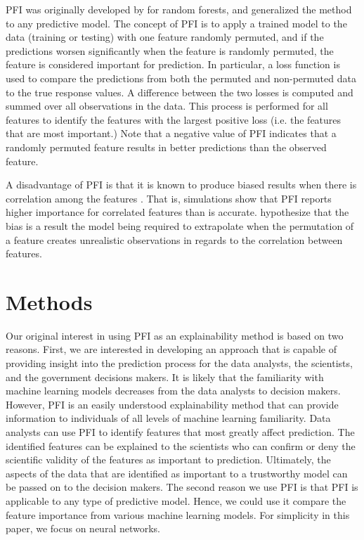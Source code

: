 \documentclass[letterpaper]{article}
\begin{document}
PFI was originally developed by \citeauthor{breiman:2001}  for random forests, and \citeauthor{fisher:2019}  generalized the method to any predictive model. The concept of PFI is to apply a trained model to the data (training or testing) with one feature randomly permuted, and if the predictions worsen significantly when the feature is randomly permuted, the feature is considered important for prediction. In particular, a loss function is used to compare the predictions from both the permuted and non-permuted data to the true response values. A difference between the two losses is computed and summed over all observations in the data. This process is performed for all features to identify the features with the largest positive loss (i.e. the features that are most important.) Note that a negative value of PFI indicates that a randomly permuted feature results in better predictions than the observed feature. 

A disadvantage of PFI is that it is known to produce biased results when there is correlation among the features \cite{hooker:2019,nicodemus:2010,strobl:2007}. That is, simulations show that PFI reports higher importance for correlated features than is accurate. \citeauthor{hooker:2019}  hypothesize that the bias is a result the model being required to extrapolate when the permutation of a feature creates unrealistic observations in regards to the correlation between features.

\section{Methods} \label{methods}

Our original interest in using PFI as an explainability method is based on two reasons. First, we are interested in developing an approach that is capable of providing insight into the prediction process for the data analysts, the scientists, and the government decisions makers. It is likely that the familiarity with machine learning models decreases from the data analysts to decision makers. However, PFI is an easily understood explainability method that can provide information to individuals of all levels of machine learning familiarity. Data analysts can use PFI to identify features that most greatly affect prediction. The identified features can be explained to the scientists who can confirm or deny the scientific validity of the features as important to prediction. Ultimately, the aspects of the data that are identified as important to a trustworthy model can be passed on to the decision makers. The second reason we use PFI is that PFI is applicable to any type of predictive model. Hence, we could use it compare the feature importance from various machine learning models. For simplicity in this paper, we focus on neural networks.
\end{document}

